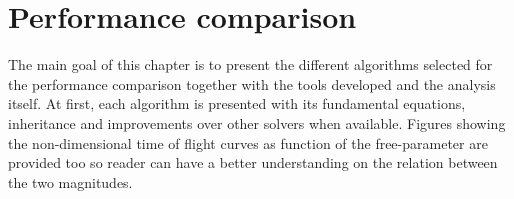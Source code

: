 \chapter{Performance comparison}

The main goal of this chapter is to present the different algorithms selected
for the performance comparison together with the tools developed and the
analysis itself. At first, each algorithm is presented with its
fundamental equations, inheritance and improvements over other solvers
when available. Figures showing the non-dimensional time of flight curves as
function of the free-parameter are provided too so reader can have a better
understanding on the relation between the two magnitudes.


